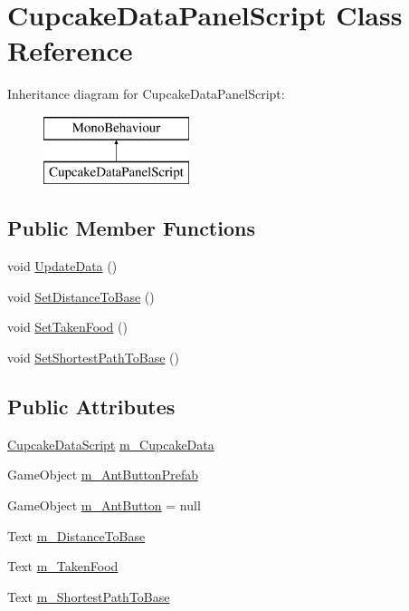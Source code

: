 \hypertarget{class_cupcake_data_panel_script}{}\section{Cupcake\+Data\+Panel\+Script Class Reference}
\label{class_cupcake_data_panel_script}
Inheritance diagram for Cupcake\+Data\+Panel\+Script\+:\begin{figure}[H]
\begin{center}
\leavevmode
\includegraphics[height=2.000000cm]{class_cupcake_data_panel_script}
\end{center}
\end{figure}
\subsection*{Public Member Functions}
\begin{DoxyCompactItemize}
\item 
void \mbox{\hyperlink{class_cupcake_data_panel_script_ab3b7689e6b343a7bbafaa57efb7e44f6}{Update\+Data}} ()
\item 
void \mbox{\hyperlink{class_cupcake_data_panel_script_af7fcfab878f7cdceb63132f2cf3a60f1}{Set\+Distance\+To\+Base}} ()
\item 
void \mbox{\hyperlink{class_cupcake_data_panel_script_a834b8bca0846f891fe237d76ff57ab3c}{Set\+Taken\+Food}} ()
\item 
void \mbox{\hyperlink{class_cupcake_data_panel_script_a72b67777e3d2b41364b4434deef37087}{Set\+Shortest\+Path\+To\+Base}} ()
\end{DoxyCompactItemize}
\subsection*{Public Attributes}
\begin{DoxyCompactItemize}
\item 
\mbox{\hyperlink{class_cupcake_data_script}{Cupcake\+Data\+Script}} \mbox{\hyperlink{class_cupcake_data_panel_script_a494ef3c314f9c012d44b37fd8169288c}{m\+\_\+\+Cupcake\+Data}}
\item 
Game\+Object \mbox{\hyperlink{class_cupcake_data_panel_script_a46f51e46a7d67a8f575cda4e815d3f73}{m\+\_\+\+Ant\+Button\+Prefab}}
\item 
Game\+Object \mbox{\hyperlink{class_cupcake_data_panel_script_aef551fb919aac49b59a215fe5dfd0ec2}{m\+\_\+\+Ant\+Button}} = null
\item 
Text \mbox{\hyperlink{class_cupcake_data_panel_script_afc037dff81ff22a9ac7bfd8a1b84b9ed}{m\+\_\+\+Distance\+To\+Base}}
\item 
Text \mbox{\hyperlink{class_cupcake_data_panel_script_aa8068f4f395002177180ed78204d204f}{m\+\_\+\+Taken\+Food}}
\item 
Text \mbox{\hyperlink{class_cupcake_data_panel_script_a3b1f5c7abdf157f8c906e8b0e61266a1}{m\+\_\+\+Shortest\+Path\+To\+Base}}
\end{DoxyCompactItemize}


